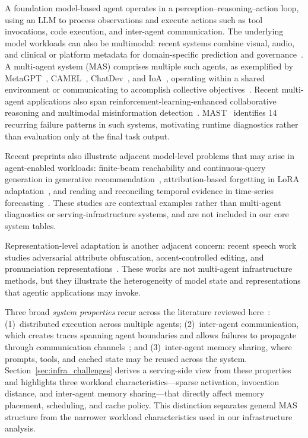 A foundation model-based agent operates in a perception--reasoning--action loop, using an LLM to process observations and execute actions such as tool invocations, code execution, and inter-agent communication. The underlying model workloads can also be multimodal: recent systems combine visual, audio, and clinical or platform metadata for domain-specific prediction and governance~\cite{wang-etal-2025-reasoning-enhanced,10.1145/3711896.3737195,xu2026mobifusiondrm}. A multi-agent system (MAS) comprises multiple such agents, as exemplified by MetaGPT~\cite{metagpt2024}, CAMEL~\cite{camel2023}, ChatDev~\cite{chatdev2024}, and IoA~\cite{ioa2025}, operating within a shared environment or communicating to accomplish collective objectives~\cite{li2024, wang2026classical}. Recent multi-agent applications also span reinforcement-learning-enhanced collaborative reasoning and multimodal misinformation detection~\cite{li2026draftrl,li2026retrievalaugmentedfakenews}. MAST~\cite{mast2025} identifies 14 recurring failure patterns in such systems, motivating runtime diagnostics rather than evaluation only at the final task output.

Recent preprints also illustrate adjacent model-level problems that may arise in agent-enabled workloads: finite-beam reachability and continuous-query generation in generative recommendation~\cite{sun2026semanticidsfinitebeamreachability}, attribution-based forgetting in LoRA adaptation~\cite{sun2026staticgradientattributionunderperforms}, and reading and reconciling temporal evidence in time-series forecasting~\cite{guan2026timbreteachingtimeseries}. These studies are contextual examples rather than multi-agent diagnostics or serving-infrastructure systems, and are not included in our core system tables.

Representation-level adaptation is another adjacent concern: recent speech work studies adversarial attribute obfuscation, accent-controlled editing, and pronunciation representations~\cite{11249000,qu2026partialaccentcontroleditingfrozen,qu2026phonemeawarepronunciationrepresentationsl2english}. These works are not multi-agent infrastructure methods, but they illustrate the heterogeneity of model state and representations that agentic applications may invoke.

Three broad \emph{system properties} recur across the literature reviewed here~\cite{understandingmas2026}: (1)~distributed execution across multiple agents; (2)~inter-agent communication, which creates traces spanning agent boundaries and allows failures to propagate through communication channels~\cite{famas2025, traceelephant2026}; and (3)~inter-agent memory sharing, where prompts, tools, and cached state may be reused across the system. Section~\ref{sec:infra_challenges} derives a serving-side view from these properties and highlights three workload characteristics---sparse activation, invocation distance, and inter-agent memory sharing---that directly affect memory placement, scheduling, and cache policy. This distinction separates general MAS structure from the narrower workload characteristics used in our infrastructure analysis.

